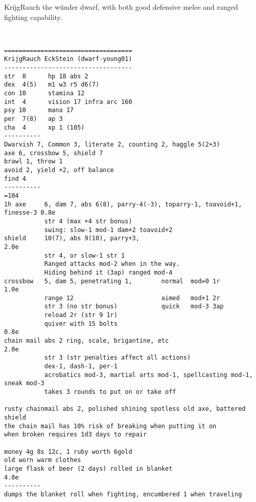 \clearpage
\begin{samepage}

\noindent KrijgRauch the wünder dwarf, with both good defensive melee and ranged fighting capability.

\

\small \begin{verbatim}
===================================
KrijgRauch EckStein (dwarf-young01)
-----------------------------------
str  8      hp 18 abs 2
dex  4(5)   m1 w3 r5 d6(7)
con 10      stamina 12
int  4      vision 17 infra arc 160
psy 10      mana 17
per  7(8)   ap 3
cha  4      xp 1 (105)
----------
Dwarvish 7, Common 3, literate 2, counting 2, haggle 5(2+3)
axe 6, crossbow 5, shield 7
brawl 1, throw 1
avoid 2, yield +2, off balance
find 4
----------                                                                  =104
1h axe     6, dam 7, abs 6(8), parry-4(-3), toparry-1, toavoid+1, finesse-3 0.8e
           str 4 (max +4 str bonus)
           swing: slow-1 mod-1 dam+2 toavoid+2
shield     10(7), abs 9(10), parry+3,                                       2.0e
           str 4, or slow-1 str 1
           Ranged attacks mod-2 when in the way.
           Hiding behind it (3ap) ranged mod-4
crossbow   5, dam 5, penetrating 1,        normal  mod=0 1r                 1.0e
           range 12                        aimed   mod+1 2r
           str 3 (no str bonus)            quick   mod-3 3ap
           reload 2r (str 9 1r)
           quiver with 15 bolts                                             0.8e
chain mail abs 2 ring, scale, brigantine, etc                               2.0e
           str 3 (str penalties affect all actions)
           dex-1, dash-1, per-1
           acrobatics mod-3, martial arts mod-1, spellcasting mod-1, sneak mod-3
           takes 3 rounds to put on or take off

rusty chainmail abs 2, polished shining spotless old axe, battered shield
the chain mail has 10% risk of breaking when putting it on
when broken requires 1d3 days to repair

money 4g 8s 12c, 1 ruby worth 6gold
old worn warm clothes
large flask of beer (2 days) rolled in blanket                              4.0e
----------
dumps the blanket roll when fighting, encumbered 1 when traveling
\end{verbatim} \end{samepage} \normalsize







